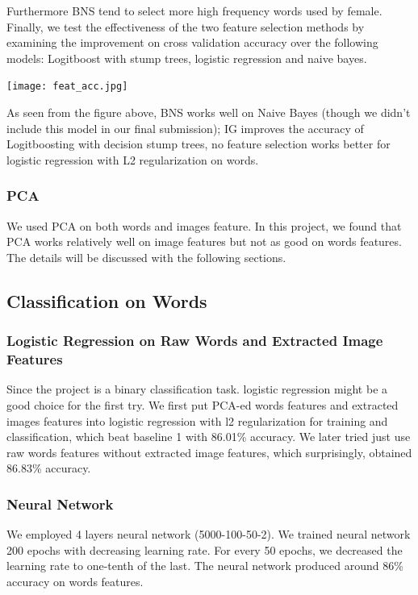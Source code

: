 Furthermore BNS tend to select more high frequency words used by female.\\
Finally, we test the effectiveness of the two feature selection methods by examining the improvement on cross validation accuracy over the following models: Logitboost with stump trees, logistic regression and naive bayes.\\
\begin{center}
\texttt{[image: feat\_acc.jpg]}
    \end{center}
    As seen from the figure above, BNS works well on Naive Bayes (though we didn't include this model in our final submission); IG improves the accuracy of Logitboosting with decision stump trees, no feature selection works better for logistic regression with L2 regularization on words.\\
\subsubsection{PCA}
We used PCA on both words and images feature. In this project, we found that PCA works relatively well on image features but not as good on words features. The details will be discussed with the following sections.

\subsection{Classification on Words}

\subsubsection{Logistic Regression on Raw Words and Extracted Image Features}
Since the project is a binary classification task. logistic regression might be a good choice for the first try. We first put PCA-ed words features and extracted images features into logistic regression with l2 regularization for training and classification, which beat baseline 1 with 86.01\% accuracy. We later tried just use raw words features without extracted image features, which surprisingly, obtained 86.83\% accuracy. 
\subsubsection{Neural Network}
We employed 4 layers neural network (5000-100-50-2). We trained neural network 200 epochs with decreasing learning rate. For every 50 epochs, we decreased the learning rate to one-tenth of the last. The neural network produced around 86\% accuracy on words features.
